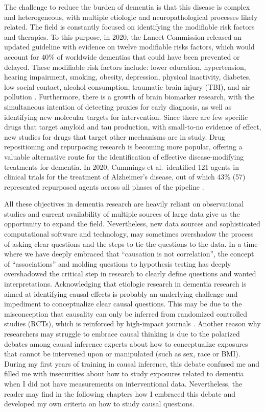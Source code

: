 \documentclass[
]{book}
\begin{document}
The challenge to reduce the burden of dementia is that this disease is complex and heterogeneous, with multiple etiologic and neuropathological processes likely related. The field is constantly focused on identifying the modifiable risk factors and therapies. To this purpose, in 2020, the Lancet Commission released an updated guideline with evidence on twelve modifiable risks factors, which would account for 40\% of worldwide dementias that could have been prevented or delayed. These modifiable risk factors include: lower education, hypertension, hearing impairment, smoking, obesity, depression, physical inactivity, diabetes, low social contact, alcohol consumption, traumatic brain injury (TBI), and air pollution \autocite{lancet2020}. Furthermore, there is a growth of brain biomarker research, with the simultaneous intention of detecting proxies for early diagnosis, as well as identifying new molecular targets for intervention. Since there are few specific drugs that target amyloid and tau production, with small-to-no evidence of effect, new studies for drugs that target other mechanisms are in study. Drug repositioning and repurposing research is becoming more popular, offering a valuable alternative route for the identification of effective disease-modifying treatments for dementia\autocite{ballard2020,langedijk2015}. In 2020, Cummings et al.~identified 121 agents in clinical trials for the treatment of Alzheimer's disease, out of which 43\% (57) represented repurposed agents across all phases of the pipeline \autocite{cummings2020}.

All these objectives in dementia research are heavily reliant on observational studies and current availability of multiple sources of large data give us the opportunity to expand the field. Nevertheless, new data sources and sophisticated computational software and technology, may sometimes overshadow the process of asking clear questions and the steps to tie the questions to the data. In a time where we have deeply embraced that ``causation is not correlation'', the concept of ``associations'' and molding questions to hypothesis testing has deeply overshadowed the critical step in research to clearly define questions and wanted interpretations. Acknowledging that etiologic research in dementia research is aimed at identifying causal effects is probably an underlying challenge and impediment to conceptualize clear causal questions. This may be due to the misconception that causality can only be inferred from randomized controlled studies (RCTs), which is reinforced by high-impact journals \autocite{jama}. Another reason why researchers may struggle to embrace causal thinking is due to the polarized debates among causal inference experts about how to conceptualize exposures that cannot be intervened upon or manipulated (such as sex, race or BMI)\autocite{waterkills,schwartz2016}. During my first years of training in causal inference, this debate confused me and filled me with insecurities about how to study exposures related to dementia when I did not have measurements on interventional data. Nevertheless, the reader may find in the following chapters how I embraced this debate and developed my own criteria on how to study causal questions.
\end{document}
